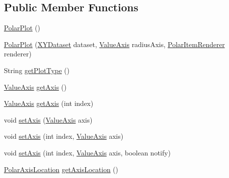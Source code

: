 \subsection*{Public Member Functions}
\begin{DoxyCompactItemize}
\item 
\mbox{\hyperlink{classorg_1_1jfree_1_1chart_1_1plot_1_1_polar_plot_a16b66a9d54995e2b91f5928f9ea6e6a7}{Polar\+Plot}} ()
\item 
\mbox{\hyperlink{classorg_1_1jfree_1_1chart_1_1plot_1_1_polar_plot_ac22d804704e7b6c12e2cab3617859671}{Polar\+Plot}} (\mbox{\hyperlink{interfaceorg_1_1jfree_1_1data_1_1xy_1_1_x_y_dataset}{X\+Y\+Dataset}} dataset, \mbox{\hyperlink{classorg_1_1jfree_1_1chart_1_1axis_1_1_value_axis}{Value\+Axis}} radius\+Axis, \mbox{\hyperlink{interfaceorg_1_1jfree_1_1chart_1_1renderer_1_1_polar_item_renderer}{Polar\+Item\+Renderer}} renderer)
\item 
String \mbox{\hyperlink{classorg_1_1jfree_1_1chart_1_1plot_1_1_polar_plot_a344dc7b5724b7af8700984f11efe8030}{get\+Plot\+Type}} ()
\item 
\mbox{\hyperlink{classorg_1_1jfree_1_1chart_1_1axis_1_1_value_axis}{Value\+Axis}} \mbox{\hyperlink{classorg_1_1jfree_1_1chart_1_1plot_1_1_polar_plot_aa23feb5967de898ada3d412c9d614825}{get\+Axis}} ()
\item 
\mbox{\hyperlink{classorg_1_1jfree_1_1chart_1_1axis_1_1_value_axis}{Value\+Axis}} \mbox{\hyperlink{classorg_1_1jfree_1_1chart_1_1plot_1_1_polar_plot_a354b78f6c68b444dcb767395ac2943f8}{get\+Axis}} (int index)
\item 
void \mbox{\hyperlink{classorg_1_1jfree_1_1chart_1_1plot_1_1_polar_plot_a31e8be5c37523541ee64ce073dcf4f52}{set\+Axis}} (\mbox{\hyperlink{classorg_1_1jfree_1_1chart_1_1axis_1_1_value_axis}{Value\+Axis}} axis)
\item 
void \mbox{\hyperlink{classorg_1_1jfree_1_1chart_1_1plot_1_1_polar_plot_a225b527fcb7ab354ec7ee747564f9b44}{set\+Axis}} (int index, \mbox{\hyperlink{classorg_1_1jfree_1_1chart_1_1axis_1_1_value_axis}{Value\+Axis}} axis)
\item 
void \mbox{\hyperlink{classorg_1_1jfree_1_1chart_1_1plot_1_1_polar_plot_a5dcb8b82b8c741742f49ad306786d863}{set\+Axis}} (int index, \mbox{\hyperlink{classorg_1_1jfree_1_1chart_1_1axis_1_1_value_axis}{Value\+Axis}} axis, boolean notify)
\item 
\mbox{\hyperlink{classorg_1_1jfree_1_1chart_1_1plot_1_1_polar_axis_location}{Polar\+Axis\+Location}} \mbox{\hyperlink{classorg_1_1jfree_1_1chart_1_1plot_1_1_polar_plot_aa5bf9d06a22374312897b364d41dd339}{get\+Axis\+Location}} ()

\end{DoxyCompactItemize}
